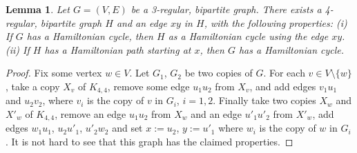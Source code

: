 \documentclass[10pt,a4paper]{article}
\newtheorem{lemma}[theorem]{Lemma}
\numberwithin{equation}{section}
\newcommand{\set}[1]{\{ #1 \}}
\begin{document}
\begin{lemma}
\label{hamilton_cycle_lemma}
Let $G = (V, E)$ be a 3-regular, bipartite graph. There exists a 4-regular, bipartite graph $H$ and an edge $xy$ in $H$, with the following properties: (i) If $G$ has a Hamiltonian cycle, then $H$ as a Hamiltonian cycle using the edge $xy$. (ii) If $H$ has a Hamiltonian path starting at $x$, then $G$ has a Hamiltonian cycle. 
\end{lemma} 

\begin{proof}
Fix some vertex $w \in V$. Let $G_1$, $G_2$ be two copies of $G$. For each $v \in V \setminus \set{w}$, take a copy $X_v$ of $K_{4,4}$, remove some edge $u_1u_2$ from $X_v$, and add edges $v_1u_1$ and $u_2v_2$, where $v_i$ is the copy of $v$ in $G_i$, $i = 1,2$. Finally take two copies $X_w$ and $X'_w$ of $K_{4,4}$, remove an edge ${u_1u_2}$ from $X_w$ and an edge $u'_1u'_2$ from $X'_w$, add edges $w_1u_1$, $u_2u'_1$, $u'_2w_2$ and set $x := u_2$, $y := u'_1$ where $w_i$ is the copy of $w$ in $G_i$. It is not hard to see that this graph has the claimed properties.
\end{proof}
\end{document}
